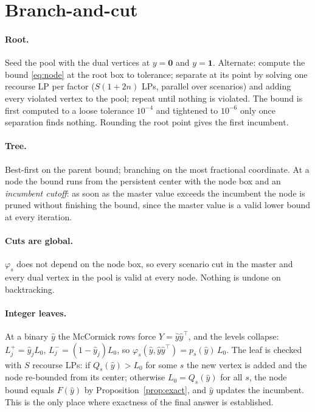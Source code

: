 \documentclass[11pt]{article}
\newcommand{\T}{^{\top}}
\begin{document}
\section{Branch-and-cut}\label{sec:bnc}

\paragraph{Root.} Seed the pool with the dual vertices at $y = \mathbf 0$ and $y = \mathbf 1$. Alternate: compute
the bound \eqref{eq:node} at the root box to tolerance; separate at its point by solving one recourse LP per factor
($S(1+2n)$ LPs, parallel over scenarios) and adding every violated vertex to the pool; repeat until nothing is
violated. The bound is first computed to a loose tolerance $10^{-4}$ and tightened to $10^{-6}$ only once separation
finds nothing. Rounding the root point gives the first incumbent.

\paragraph{Tree.} Best-first on the parent bound; branching on the most fractional coordinate. At a node the bound runs
from the persistent center with the node box and an \emph{incumbent cutoff}: as soon as the master value exceeds
the incumbent the node is pruned without finishing the bound, since the master value is a valid lower bound at every
iteration.

\paragraph{Cuts are global.} $\varphi_s$ does not depend on the node box, so every scenario cut in the master and
every dual vertex in the pool is valid at every node. Nothing is undone on backtracking.

\paragraph{Integer leaves.} At a binary $\hat y$ the McCormick rows force $Y = \hat y\hat y\T$, and the levels
collapse: $L^+_j = \hat y_jL_0$, $L^-_j = (1-\hat y_j)L_0$, so $\varphi_s(\hat y,\hat y\hat y\T) = p_s(\hat y)\,L_0$.
The leaf is checked with $S$ recourse LPs: if $Q_s(\hat y) > L_0$ for some $s$ the new vertex is added and the node
re-bounded from its center; otherwise $L_0 = Q_s(\hat y)$ for all $s$, the node bound equals $F(\hat y)$ by
Proposition~\ref{prop:exact}, and $\hat y$ updates the incumbent. This is the only place where exactness of the final
answer is established.
\end{document}
